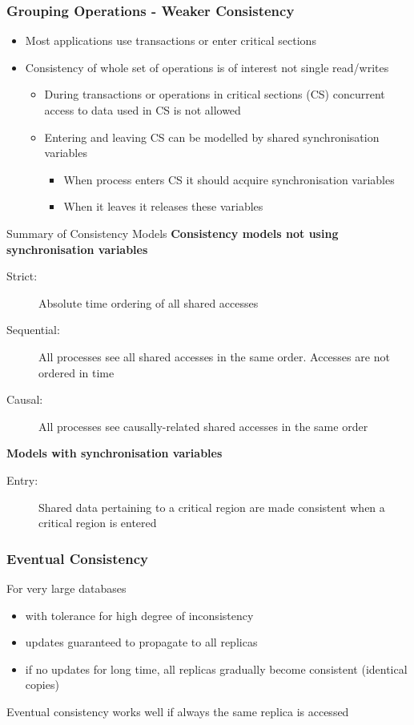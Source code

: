 \subsubsection{Grouping Operations - Weaker Consistency}
\begin{itemize}
	\item Most applications use transactions or enter critical sections
	\item Consistency of whole set of operations is of interest not single read/writes
	\begin{itemize}
		\item During transactions or operations in critical sections (CS) concurrent access to data used in CS is not allowed
		\item Entering and leaving CS can be modelled by shared synchronisation variables
		\begin{itemize}
			\item When process enters CS it should acquire synchronisation variables
			\item When it leaves it releases these variables
		\end{itemize}
	\end{itemize}
\end{itemize}

\begin{note}{Summary of Consistency Models}
\textbf{Consistency models not using synchronisation variables}
\begin{description}
	\item[Strict:] Absolute time ordering of all shared accesses
	\item[Sequential:] All processes see all shared accesses in the same order. Accesses are not ordered in time
	\item[Causal:] All processes see causally-related shared accesses in the same order
\end{description}
\textbf{Models with synchronisation variables}
\begin{description}
	\item[Entry:] Shared data pertaining to a critical region are made consistent when a critical region is entered
\end{description}
\end{note}

\subsubsection{Eventual Consistency}
For very large databases
\begin{itemize}
	\item with tolerance for high degree of inconsistency
	\item updates guaranteed to propagate to all replicas
	\item if no updates for long time, all replicas gradually become consistent (identical copies)	
\end{itemize}
Eventual consistency works well if always the same replica is accessed

